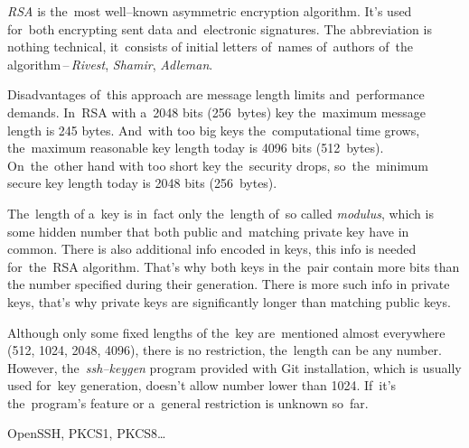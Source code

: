 \textit{RSA} is the~most well--known asymmetric encryption algorithm. It's used for~both encrypting sent data and~electronic signatures. The abbreviation is nothing technical, it~consists of initial letters of~names of~authors of~the algorithm\,--\,\textit{Rivest}, \textit{Shamir}, \textit{Adleman}.

Disadvantages of~this approach are message length limits and~performance demands. In~RSA with a~2048 bits (256~bytes) key the~maximum message length is 245 bytes. And~with too big keys the~computational time grows, the~maximum reasonable key length today is 4096 bits (512~bytes). On~the~other hand with too short key the~security drops, so~the~minimum secure key length today is 2048 bits (256~bytes).

The~length of a~key is in~fact only the~length of~so called \textit{modulus}, which is some hidden number that both public and~matching private key have in common. There is also additional info encoded in keys, this info is needed for~the~RSA algorithm. That's why both keys in the~pair contain more bits than the number specified during their generation. There is more such info in private keys, that's why private keys are significantly longer than matching public keys.

\newline\warning Although only some fixed lengths of the~key are~mentioned almost everywhere (512, 1024, 2048, 4096), there is no restriction, the~length can be any number. However, the~\textit{ssh--keygen} program provided with Git installation, which is usually used for~key generation, doesn't allow number lower than 1024. If~it's the~program's feature or a~general restriction is unknown so~far.

\newline\todo OpenSSH, PKCS1, PKCS8\dots

\label{electronicsignature}



